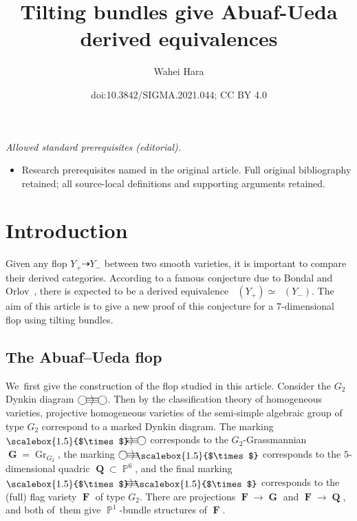 \documentclass[10pt,a4paper]{amsart}
\title{Tilting bundles give Abuaf-Ueda derived equivalences}
\author{Wahei Hara}
\date{doi:10.3842/SIGMA.2021.044; CC BY 4.0}
\DeclareMathOperator{\D}{D^b}
\DeclareMathOperator{\F}{\mathbf{F}}
\DeclareMathOperator{\Gr}{Gr}
\DeclareMathOperator{\G}{\mathbf{G}}
\DeclareMathOperator{\PP}{\mathbb{P}}
\DeclareMathOperator{\Q}{\mathbf{Q}}
\newcommand{\waheyheyarrow}{\equiv\hspace{-0.25em}\rangle\hspace{-0.55em}\equiv}
\newcommand{\waheyheytimes}{\lower0.3ex\hbox{\scalebox{1.5}{$\times$}}}
\numberwithin{equation}{section}
\begin{document}
\maketitle
\noindent\textit{Allowed standard prerequisites (editorial).}\begin{itemize}
\item Research prerequisites named in the original article. Full original bibliography retained; all source-local definitions and supporting arguments retained.
\end{itemize}\medskip
\section{Introduction}

Given any flop $Y_+ \dashrightarrow Y_-$ between two smooth varieties,
it is important to compare their derived categories.
According to a famous conjecture due to Bondal and Orlov~\cite{BO02}, there is expected to be a derived equivalence $\D(Y_+) \simeq \D(Y_-)$.
The aim of this article is to give a new proof of this conjecture for a $7$-dimensional flop using tilting bundles.

\subsection{The Abuaf--Ueda flop}
We~first give the construction of the flop studied in this article.
Consider the $G_2$ Dynkin diagram $\bigcirc\hspace{-0.45em}\waheyheyarrow\hspace{-0.45em}\bigcirc$.
Then by the classification theory of homogeneous varieties, projective homogeneous varieties of the semi-simple algebraic group of type $G_2$
correspond to a marked Dynkin diagram.
The marking $\waheyheytimes\hspace{-0.7em}\waheyheyarrow\hspace{-0.45em}\bigcirc$ corresponds to the $G_2$-Grassmannian
$\G = \Gr_{G_2}$,
the marking $\bigcirc\hspace{-0.45em}\waheyheyarrow\hspace{-0.7em}\waheyheytimes$ corresponds to the $5$-dimensional quadric $\Q \subset \PP^6$,
and the final marking $\waheyheytimes\hspace{-0.7em}\waheyheyarrow\hspace{-0.7em}\waheyheytimes$
corresponds to the (full) flag variety $\F$ of type $G_2$.
There are projections $\F \to \G$ and $\F \to \Q$, and both of~them give $\PP^1$-bundle structures of $\F$.
\end{document}
